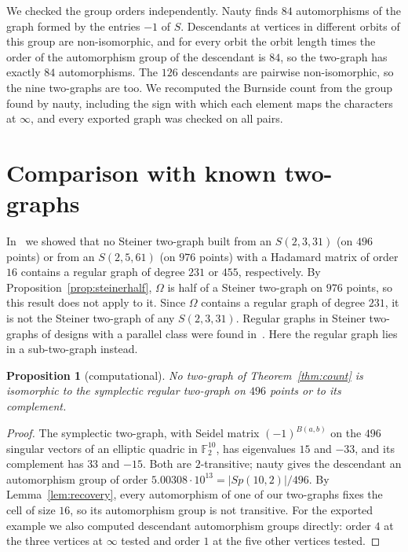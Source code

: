 \documentclass[11pt]{amsart}
\newtheorem{proposition}[theorem]{Proposition}
\theoremstyle{remark}
\newcommand{\F}{\mathbb{F}}
\begin{document}
We checked the group orders independently. Nauty finds $84$ automorphisms of the graph formed by the entries $-1$ of $S$. Descendants at vertices in different orbits of this group are non-isomorphic, and for every orbit the orbit length times the order of the automorphism group of the descendant is $84$, so the two-graph has exactly $84$ automorphisms. The $126$ descendants are pairwise non-isomorphic, so the nine two-graphs are too. We recomputed the Burnside count from the group found by nauty, including the sign with which each element maps the characters at $\infty$, and every exported graph was checked on all pairs.

\section{Comparison with known two-graphs}\label{sec:known}

In~\cite{P442} we showed that no Steiner two-graph built from an $S(2,3,31)$ (on $496$ points) or from an $S(2,5,61)$ (on $976$ points) with a Hadamard matrix of order $16$ contains a regular graph of degree $231$ or $455$, respectively. By Proposition~\ref{prop:steinerhalf}, $\Omega$ is half of a Steiner two-graph on $976$ points, so this result does not apply to it. Since $\Omega$ contains a regular graph of degree $231$, it is not the Steiner two-graph of any $S(2,3,31)$. Regular graphs in Steiner two-graphs of designs with a parallel class were found in~\cite[Theorem~3.6]{FJMPW18}. Here the regular graph lies in a sub-two-graph instead.

\begin{proposition}[computational]\label{prop:notsymplectic}
No two-graph of Theorem~\ref{thm:count} is isomorphic to the symplectic regular two-graph on $496$ points or to its complement.
\end{proposition}

\begin{proof}
The symplectic two-graph, with Seidel matrix $(-1)^{B(a,b)}$ on the $496$ singular vectors of an elliptic quadric in $\F_2^{10}$, has eigenvalues $15$ and $-33$, and its complement has $33$ and $-15$. Both are $2$-transitive; nauty gives the descendant an automorphism group of order $5.00308\cdot10^{13}=|Sp(10,2)|/496$. By Lemma~\ref{lem:recovery}, every automorphism of one of our two-graphs fixes the cell of size $16$, so its automorphism group is not transitive. For the exported example we also computed descendant automorphism groups directly: order $4$ at the three vertices at $\infty$ tested and order $1$ at the five other vertices tested.
\end{proof}
\end{document}
